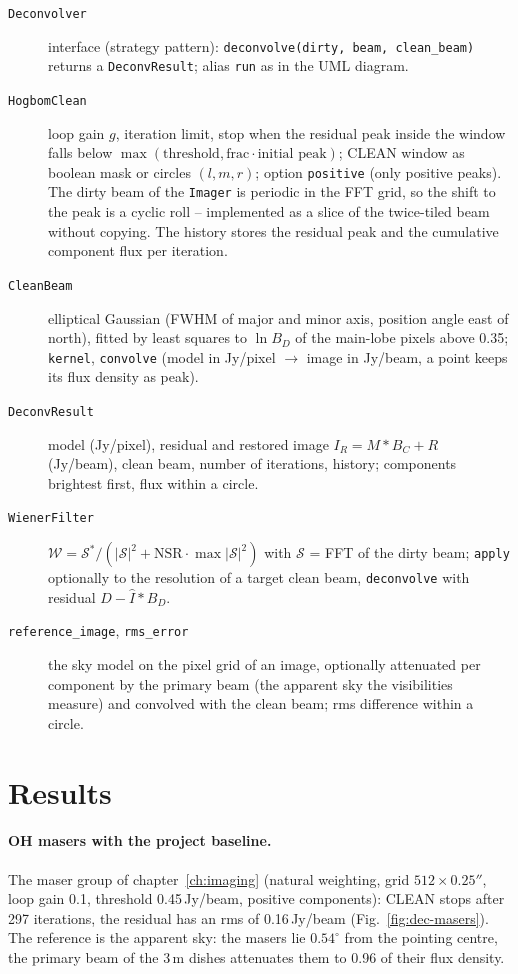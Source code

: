 \begin{description}
  \item[\texttt{Deconvolver}] interface (strategy pattern):
        \texttt{deconvolve(dirty, beam, clean\_beam)} returns a
        \texttt{DeconvResult}; alias \texttt{run} as in the UML diagram.
  \item[\texttt{HogbomClean}] loop gain $g$, iteration limit, stop when the
        residual peak inside the window falls below
        $\max(\text{threshold}, \text{frac}\cdot\text{initial peak})$; CLEAN
        window as boolean mask or circles $(l, m, r)$; option
        \texttt{positive} (only positive peaks). The dirty beam of the
        \texttt{Imager} is periodic in the FFT grid, so the shift to the peak
        is a cyclic roll -- implemented as a slice of the twice-tiled beam
        without copying. The history stores the residual peak and the
        cumulative component flux per iteration.
  \item[\texttt{CleanBeam}] elliptical Gaussian (FWHM of major and minor
        axis, position angle east of north), fitted by least squares to
        $\ln B_D$ of the main-lobe pixels above 0.35; \texttt{kernel},
        \texttt{convolve} (model in Jy/pixel $\to$ image in Jy/beam, a point
        keeps its flux density as peak).
  \item[\texttt{DeconvResult}] model (Jy/pixel), residual and restored image
        $I_R = M * B_C + R$ (Jy/beam), clean beam, number of iterations,
        history; components brightest first, flux within a circle.
  \item[\texttt{WienerFilter}] $\mathcal W = \mathcal S^*/(|\mathcal S|^2 +
        \text{NSR}\cdot\max|\mathcal S|^2)$ with $\mathcal S$ = FFT of the
        dirty beam; \texttt{apply} optionally to the resolution of a target
        clean beam, \texttt{deconvolve} with residual
        $D - \hat I * B_D$.
  \item[\texttt{reference\_image}, \texttt{rms\_error}] the sky model on
        the pixel grid of an image, optionally attenuated per component by
        the primary beam (the apparent sky the visibilities measure) and
        convolved with the clean beam; rms difference within a circle.
\end{description}

\section{Results}

\paragraph*{OH masers with the project baseline.} The maser group of
chapter~\ref{ch:imaging} (natural weighting, grid $512\times0.25''$, loop
gain 0.1, threshold 0.45\,Jy/beam, positive components): CLEAN stops after
297 iterations, the residual has an rms of 0.16\,Jy/beam
(Fig.~\ref{fig:dec-masers}). The reference is the apparent sky: the masers
lie $0.54^\circ$ from the pointing centre, the primary beam of the 3\,m
dishes attenuates them to 0.96 of their flux density.

